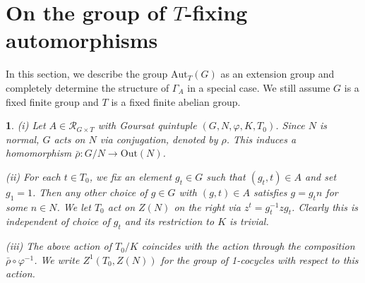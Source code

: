 \documentclass[12pt]{article}
\theoremstyle{change}
\newtheorem{nothing}[theorem]{}
\newcommand{\Aut}{\mathrm{Aut}}
\newcommand{\calR}{\mathcal{R}}
\newcommand{\Out}{\mathrm{Out}}
\newcommand{\1}{{\bf 1}}
\begin{document}
\section{On the group of $T$-fixing automorphisms}
In this section, we describe the group $\Aut_T(G)$ as an extension group and completely determine the structure of $\Gamma_A$ in a special case. We still assume $G$ is a fixed finite group and $T$ is a fixed finite abelian group. 

\begin{nothing}
  (i)  Let $A\in \calR_{G\times T}$ with Goursat quintuple $(G, N, \varphi, K, T_0)$. Since $N$ is normal, $G$ acts on $N$ via conjugation, denoted by $\rho$. This induces a homomorphism $\bar\rho: G/N \to \Out(N)$. 

  \noindent (ii) For each $t\in T_0$, we fix an element $g_t\in G$ such that $(g_t, t)\in A$ and set $g_1 = 1$. Then any other choice of $g\in G$ with $(g, t)\in A$ satisfies $g = g_t n$ for some $n\in N$. We let $T_0$ act on $Z(N)$ on the right via $z^t = g_t^{-1}zg_t$. Clearly this is independent of choice of $g_t$ and its restriction to $K$ is trivial.

  \noindent (iii) The above action of $T_0/K$ coincides with the action through the composition $\bar\rho\circ\varphi^{-1}$. We write $Z^1(T_0, Z(N))$ for the group of 1-cocycles with respect to this action. 
\end{nothing}
\end{document}
